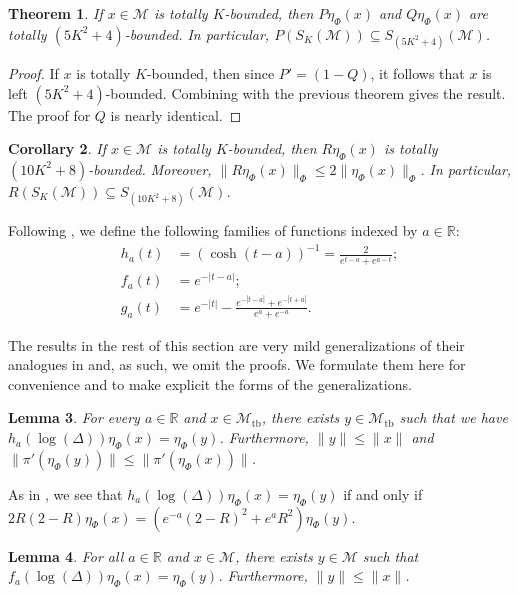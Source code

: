 \documentclass[12pt]{amsart}
\newtheorem{thm}{Theorem}[section]
\newtheorem{lem}[thm]{Lemma}
\newtheorem{cor}[thm]{Corollary}
\theoremstyle{definition}
\def\cal{\mathcal}
\def \tb{\operatorname{tb}}
\def \bbR{\mathbb{R}}
\begin{document}
\begin{thm} \label{PQtotalbounds}
    If $x \in \cal M$ is totally $K$-bounded, then $P\eta_{\Phi}(x)$ and $Q\eta_{\Phi}(x)$ are totally $(5K^2+4)$-bounded.  In particular, $P(S_K(\cal M)) \subseteq S_{(5K^2+4)}(\cal M)$.
\end{thm}

\begin{proof}
    If $x$ is totally $K$-bounded, then since $P' = (1-Q)$, it follows that $x$ is left $(5K^2+4)$-bounded.  Combining with the previous theorem gives the result.  The proof for $Q$ is nearly identical.
\end{proof}

\begin{cor}\label{Rtotalbound}
    If $x \in \cal M$ is totally $K$-bounded, then $R\eta_{\Phi}(x)$ is totally $(10K^2+8)$-bounded.  Moreover, $\|R\eta_{\Phi}(x)\|_{\Phi} \leq 2\|\eta_{\Phi}(x)\|_{\Phi}$.  In particular, $R(S_{K}(\cal M)) \subseteq S_{(10K^2 + 8)}(\cal M)$.
\end{cor}

Following \cite{Kad}, we define the following families of functions indexed by $a \in \bbR$:
\begin{align}
    h_{a}(t) &= (\cosh(t-a))^{-1} = \frac{2}{e^{t-a} + e^{a-t}}; \nonumber \\
    f_{a}(t) &= e^{-|t-a|}; \nonumber \\
    g_a(t) &= e^{-|t|} - \frac{e^{-|t-a|} + e^{-|t+a|}}{e^a + e^{-a}}.  \nonumber
\end{align}

The results in the rest of this section are very mild generalizations of their analogues in \cite{AGHS} and, as such, we omit the proofs.  We formulate them here for convenience and to make explicit the forms of the generalizations.

\begin{lem}\label{haTotalBound}
    For every $a \in \bbR$ and $x \in \cal M_{\tb}$, there exists $y \in \cal M_{\tb}$ such that we have $h_{a}(\log(\Delta))\eta_{\Phi}(x) = \eta_{\Phi}(y)$.  Furthermore, $\|y\| \leq \|x\|$ and $\|\pi'(\eta_{\Phi}(y))\| \leq \|\pi'(\eta_{\Phi}(x))\|$.
\end{lem}

As in \cite{AGHS}, we see that $h_a(\log(\Delta))\eta_{\Phi}(x) = \eta_{\Phi}(y)$ if and only if $2R(2-R)\eta_{\Phi}(x) = (e^{-a}(2-R)^2 + e^{a}R^2)\eta_{\Phi}(y)$.

\begin{lem}{\cite[Lemma 4.11]{Kad}}
    For all $a \in \bbR$ and $x \in \cal M$, there exists $y \in \cal M$ such that $f_{a}(\log(\Delta))\eta_{\Phi}(x) = \eta_{\Phi}(y)$.  Furthermore, $\|y\| \leq \|x\|$.
\end{lem}
\end{document}
